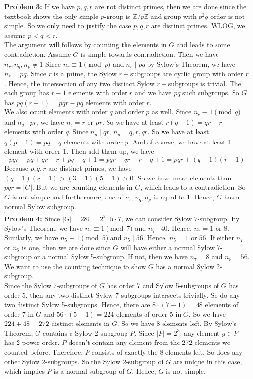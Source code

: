 \documentclass[12pt]{amsart}
\newcommand{\Z}{\mathbb{Z}}
\begin{document}
\textbf{Problem 3:} If we have $p,q,r$ are not distinct primes, then we are done since the textbook shows the only simple $p$-group is $\Z/p\Z$ and group with $p^2q$ order is not simple. So we only need to justify the case $p,q,r$ are distinct primes. WLOG, we assume $p<q<r$.\\
The argument will follows by counting the elements in $G$ and leads to some contradiction. Assume $G$ is simple towards contradiction. Then we have $n_r,n_q,n_p\neq 1$  Since $n_r\equiv 1 \pmod p$ and $n_r\mid pq$ by Sylow's Theorem, we have $n_r=pq$. Since $r$ is a prime, the Sylow $r-$subgroups are cyclic group with order $r$. Hence, the intersection of any two distinct Sylow $r-$subgroups is trivial. The each group has $r-1$ elements with order $r$ and we have $pq$ such subgroups. So $G$ has $pq(r-1)=pqr-pq$ elements with order $r$.\\ We also count elements with order $q$ and order $p$ as well. Since $n_q\equiv 1 \pmod q$ and $n_q\mid pr$, we have $n_q=r$ or $pr$. So we have at least $r(q-1)=qr-r$ elements with order $q$. Since $n_p\mid qr$, $n_p=q,r,qr$. So we have at least $q(p-1)=pq-q$ elements with order $p$. And of course, we have at least 1 element with order 1. Then add them up, we have 
\[pqr-pq+qr-r+pq-q+1=pqr+qr-r-q+1=pqr+(q-1)(r-1)\]
Because $p,q,r$ are distinct primes, we have $(q-1)(r-1)>(3-1)(5-1)>0$. So we have more elements than $pqr=|G|$. But we are counting elements in $G$, which leads to a contradiction. So $G$ is not simple and furthermore, one of $n_r,n_q,n_p$ is equal to 1. Hence, $G$ has a normal Sylow subgroup.
\\\phantom{qed}\hfill$\square$\\
\textbf{Problem 4:} Since $|G|=280=2^3\cdot 5\cdot 7$, we can consider Sylow 7-subgroup. By Sylow's Theorem, we have $n_7\equiv 1\pmod 7$ and $n_7\mid 40$. Hence, $n_7=1$ or $8$. Similarly, we have $n_5\equiv 1 \pmod 5$ and $n_5\mid 56$. Hence, $n_5=1$ or $56$. If either $n_7$ or $n_5$ is one, then we are done since $G$ will have either a normal Sylow 7-subgroup or a normal Sylow 5-subgroup. If not, then we have $n_7=8$ and $n_5=56$. We want to use the counting technique to show $G$ has a normal Sylow 2-subgroup.\\
Since the Sylow 7-subgroups of $G$ has order 7 and Sylow 5-subgroups of $G$ has order 5, then any two distinct Sylow 7-subgroups intersects trivially. So do any two distinct Sylow 5-subgroups. Hence, there are $8\cdot (7-1)=48$ elements of order 7 in $G$ and $56\cdot(5-1)=224$ elements of order 5 in $G$. So we have $224+48=272$ distinct elements in $G$. So we have 8 elements left. By Sylow's Theorem, $G$ contains a Sylow 2-subgroup $P$. Since $|P|=2^3$, any element $g\in P$ has 2-power order. $P$ doesn't contain any element from the 272 elements we counted before. Therefore, $P$ consists of exactly the 8 elements left. So does any other Sylow 2-subgroups. So the Sylow 2-subgroup of $G$ are unique in this case, which implies $P$ is a normal subgroup of $G$. Hence, $G$ is not simple.
\end{document}
